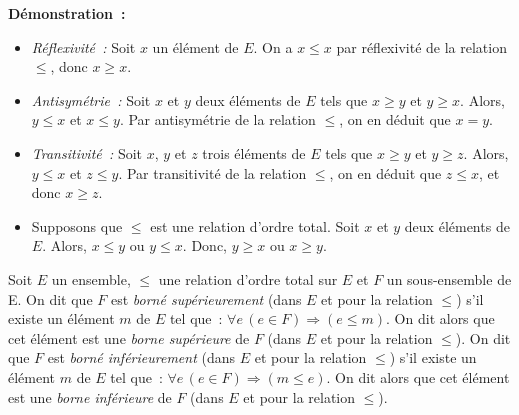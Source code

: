 \noindent\textbf{Démonstration :}
\begin{itemize}[nosep]
    \item \textit{Réflexivité :} Soit $x$ un élément de $E$. On a $x \leq x$ par réflexivité de la relation $\leq$, donc $x \geq x$. 
    \item \textit{Antisymétrie :} Soit $x$ et $y$ deux éléments de $E$ tels que $x \geq y$ et $y \geq x$.
        Alors, $y \leq x$ et $x \leq y$.
        Par antisymétrie de la relation $\leq$, on en déduit que $x = y$.
    \item \textit{Transitivité :} Soit $x$, $y$ et $z$ trois éléments de $E$ tels que $x \geq y$ et $y \geq z$.
        Alors, $y \leq x$ et $z \leq y$.
        Par transitivité de la relation $\leq$, on en déduit que $z \leq x$, et donc $x \geq z$.
    \item Supposons que $\leq$ est une relation d'ordre total.
        Soit $x$ et $y$ deux éléments de $E$. 
        Alors, $x \leq y$ ou $y \leq x$.
        Donc, $y \geq x$ ou $x \geq y$.
\end{itemize}

\done

\medskip

Soit $E$ un ensemble, $\leq$ une relation d'ordre total sur $E$ et $F$ un sous-ensemble de E. 
On dit que $F$ est \textit{borné supérieurement} (dans $E$ et pour la relation $\leq$) s'il existe un élément $m$ de $E$ tel que : $\forall e \, (e \in F) \Rightarrow (e \leq m)$. 
On dit alors que cet élément est une \textit{borne supérieure} de $F$ (dans $E$ et pour la relation $\leq$).
On dit que $F$ est \textit{borné inférieurement} (dans $E$ et pour la relation $\leq$) s'il existe un élément $m$ de $E$ tel que : $\forall e \, (e \in F) \Rightarrow (m \leq e)$.
On dit alors que cet élément est une \textit{borne inférieure} de $F$ (dans $E$ et pour la relation $\leq$).
 

